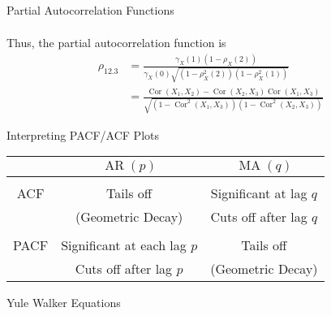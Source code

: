 \documentclass{article}
\DeclareMathOperator{\Cor}{Cor}
\DeclareMathOperator{\ar}{AR}
\DeclareMathOperator{\ma}{MA}
\begin{document}
\begin{multicols*}{3}
\begin{blackbox}{Partial Autocorrelation Functions}
\begin{enumerate}[label=\roman*), leftmargin=7pt]
\begin{align*}
        \end{align*}
        Thus, the partial autocorrelation function is
        \vspace{-1ex}
        \begin{align*}
            \rho_{12.3} &= \frac{\gamma_X(1)(1-\rho_X(2))}{\gamma_X(0)\sqrt{(1-\rho_X^2(2))(1-\rho_X^2(1))}}\\
            &= \frac{\Cor(X_1,X_2) - \Cor(X_2,X_3)\Cor(X_1,X_3)}{\sqrt{(1-\Cor^2(X_1,X_3))(1-\Cor^2(X_2,X_3))}}
        \end{align*}
    \end{enumerate}
\end{blackbox}
\begin{blackbox}{Interpreting PACF/ACF Plots}
    \begin{center}
        \begin{tabular}{c|c|c}
            & $\ar(p)$ & $\ma(q)$\\ 
            \hline
        & &  \\
        ACF & Tails off & Significant at lag $q$ \\
        &  (Geometric Decay) & Cuts off after lag $q$ \\
        \hline
        & & \\
        PACF & Significant at each lag $p$ & Tails off \\
        & Cuts off after lag $p$ & (Geometric Decay) \\
        \end{tabular}
    \end{center}
\end{blackbox}

\begin{blackbox}{Yule Walker Equations}
    
\end{blackbox}

\end{multicols*}
\end{document}
